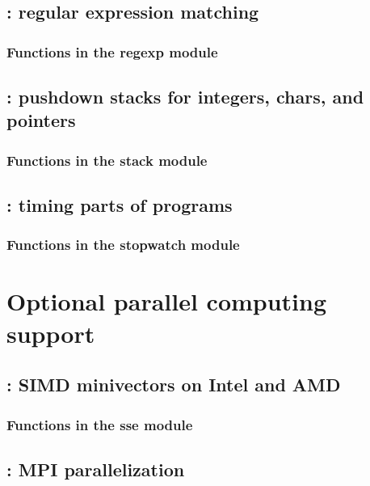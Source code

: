 \documentclass[10pt]{book}
\begin{document}
\newpage
\section{: regular expression matching}

\subsection{Functions in the regexp module}


\newpage
\section{: pushdown stacks for integers, chars, and pointers}

\subsection{Functions in the stack module}


\newpage
\section{: timing parts of programs}

\subsection{Functions in the stopwatch module}




\newpage
\chapter{Optional parallel computing support}

\newpage
\section{: SIMD minivectors on Intel and AMD }

\subsection{Functions in the sse module}



\newpage
\section{: MPI parallelization}

\end{document}
